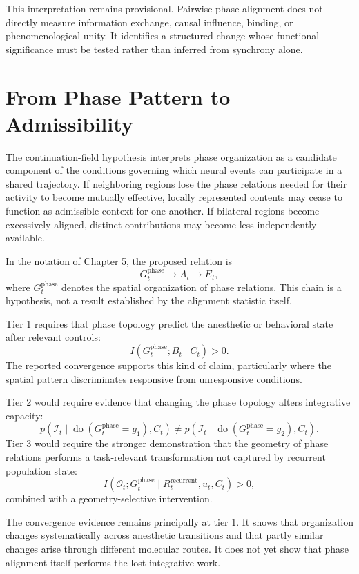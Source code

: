 \documentclass[11pt]{book}
\begin{document}
This interpretation remains provisional. Pairwise phase alignment does not directly measure information exchange, causal influence, binding, or phenomenological unity. It identifies a structured change whose functional significance must be tested rather than inferred from synchrony alone.

\section*{From Phase Pattern to Admissibility}

The continuation-field hypothesis interprets phase organization as a candidate component of the conditions governing which neural events can participate in a shared trajectory. If neighboring regions lose the phase relations needed for their activity to become mutually effective, locally represented contents may cease to function as admissible context for one another. If bilateral regions become excessively aligned, distinct contributions may become less independently available.

In the notation of Chapter 5, the proposed relation is
\[
G_t^{\mathrm{phase}}
\longrightarrow
A_t
\longrightarrow
E_t,
\]
where $G_t^{\mathrm{phase}}$ denotes the spatial organization of phase relations. This chain is a hypothesis, not a result established by the alignment statistic itself.

Tier 1 requires that phase topology predict the anesthetic or behavioral state after relevant controls:
\[
I\!\left(
G_t^{\mathrm{phase}};
B_t
\mid
C_t
\right)>0.
\]
The reported convergence supports this kind of claim, particularly where the spatial pattern discriminates responsive from unresponsive conditions.

Tier 2 would require evidence that changing the phase topology alters integrative capacity:
\[
p\!\left(
\mathcal I_t
\mid
\operatorname{do}(G_t^{\mathrm{phase}}=g_1),C_t
\right)
\neq
p\!\left(
\mathcal I_t
\mid
\operatorname{do}(G_t^{\mathrm{phase}}=g_2),C_t
\right).
\]
Tier 3 would require the stronger demonstration that the geometry of phase relations performs a task-relevant transformation not captured by recurrent population state:
\[
I\!\left(
\mathcal O_t;
G_t^{\mathrm{phase}}
\mid
R_t^{\mathrm{recurrent}},
u_t,
C_t
\right)>0,
\]
combined with a geometry-selective intervention.

The convergence evidence remains principally at tier 1. It shows that organization changes systematically across anesthetic transitions and that partly similar changes arise through different molecular routes. It does not yet show that phase alignment itself performs the lost integrative work.
\end{document}
